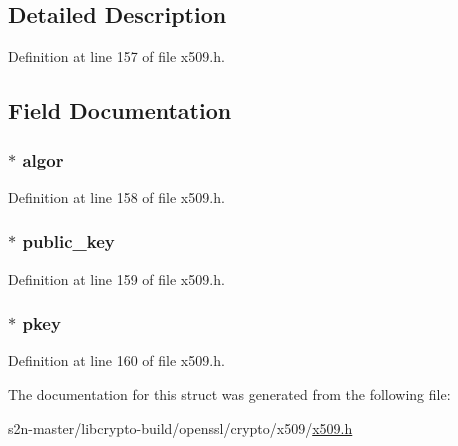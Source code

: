 \subsection{Detailed Description}


Definition at line 157 of file x509.\+h.



\subsection{Field Documentation}
\subsubsection[{\texorpdfstring{algor}{algor}}]{ $\ast$ algor}\hypertarget{struct_x509__pubkey__st_a22b96fe8b8a2f288e3672f438d25b232}{}\label{struct_x509__pubkey__st_a22b96fe8b8a2f288e3672f438d25b232}


Definition at line 158 of file x509.\+h.

\subsubsection[{\texorpdfstring{public\+\_\+key}{public_key}}]{ $\ast$ public\+\_\+key}\hypertarget{struct_x509__pubkey__st_a1121509a74c2a9e9de7edc781d512f61}{}\label{struct_x509__pubkey__st_a1121509a74c2a9e9de7edc781d512f61}


Definition at line 159 of file x509.\+h.

\subsubsection[{\texorpdfstring{pkey}{pkey}}]{ $\ast$ pkey}\hypertarget{struct_x509__pubkey__st_ad6e367842646f43c91845fb952047fe3}{}\label{struct_x509__pubkey__st_ad6e367842646f43c91845fb952047fe3}


Definition at line 160 of file x509.\+h.



The documentation for this struct was generated from the following file\+:\begin{DoxyCompactItemize}
\item 
s2n-\/master/libcrypto-\/build/openssl/crypto/x509/\hyperlink{crypto_2x509_2x509_8h}{x509.\+h}\end{DoxyCompactItemize}
